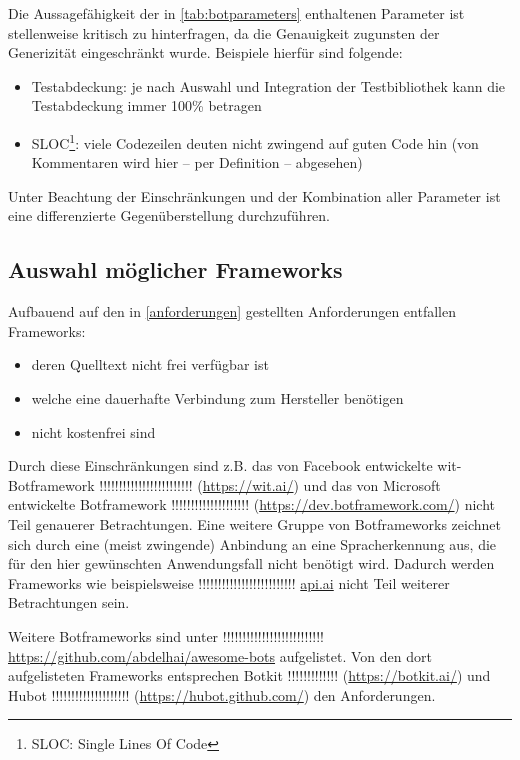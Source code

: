 Die Aussagefähigkeit der in \autoref{tab:botparameters} enthaltenen Parameter ist stellenweise kritisch zu hinterfragen, da die Genauigkeit zugunsten der Generizität eingeschränkt wurde. 
Beispiele hierfür sind folgende:
\begin{itemize}
    \item Testabdeckung: je nach Auswahl und Integration der Testbibliothek kann die Testabdeckung immer 100\% betragen
\item SLOC\footnote{SLOC: Single Lines Of Code}: viele Codezeilen deuten nicht zwingend auf guten Code hin (von Kommentaren wird hier -- per Definition -- abgesehen)
\end{itemize}

Unter Beachtung der Einschränkungen und der Kombination aller Parameter ist eine differenzierte Gegenüberstellung durchzuführen.

\subsection{Auswahl möglicher Frameworks}

Aufbauend auf den in \autoref{anforderungen} gestellten Anforderungen entfallen Frameworks:
\begin{itemize}
    \item deren Quelltext nicht frei verfügbar ist
    \item welche eine dauerhafte Verbindung zum Hersteller benötigen
    \item nicht kostenfrei sind
\end{itemize}

Durch diese Einschränkungen sind z.B. das von Facebook entwickelte wit-Botframework \cite{witai} !!!!!!!!!!!!!!!!!!!!!!!!  (\url{https://wit.ai/})
und das von Microsoft entwickelte Botframework \cite{microsoftbot} !!!!!!!!!!!!!!!!!!!! (\url{https://dev.botframework.com/}) nicht Teil genauerer Betrachtungen.
Eine weitere Gruppe von Botframeworks zeichnet sich durch eine (meist zwingende) Anbindung an eine Spracherkennung aus, die für den hier gewünschten Anwendungsfall nicht benötigt wird. Dadurch werden Frameworks wie beispielsweise \cite{apiai} !!!!!!!!!!!!!!!!!!!!!!!!! \url{api.ai} nicht Teil weiterer Betrachtungen sein.


Weitere Botframeworks sind unter \cite{botlist} !!!!!!!!!!!!!!!!!!!!!!!!!! \url{https://github.com/abdelhai/awesome-bots} aufgelistet. 
Von den dort aufgelisteten Frameworks entsprechen Botkit \cite{botkit} !!!!!!!!!!!!! (\url{https://botkit.ai/}) und Hubot \cite{hubot} !!!!!!!!!!!!!!!!!!!! (\url{https://hubot.github.com/}) den Anforderungen.

